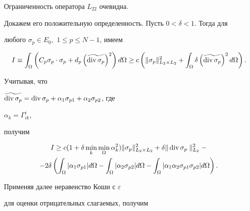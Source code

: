 \begin{pf} Ограниченность оператора $L_{22}$ очевидна.


Докажем его положительную определенность. Пусть $0<\delta <1$. Тогда для


любого $ \sigma_p \in E_0,$ $1 \le p \le N-1 $, имеем


$$


I \equiv


\int_ \Omega \left (


C_{p}\sigma _{p}\cdot \sigma _{p} + d_{p} \left ( \widetilde {\divv \sigma_p}


\right )^2 \right ) d \Omega \ge 


c \left ( \| \sigma_p \| ^2_{L_{2} \times L_{2}} 


+\int _{\Omega } 


\delta \left ( \widetilde {\divv \sigma_p } \right ) ^2 d\Omega \right ).


$$


Учитывая, что 


$


\widetilde {\divv \sigma_p} = \divv \sigma_p + \alpha _1 \sigma_{p1} +


\alpha _2 \sigma_{p2} $, где


$\alpha _k = \Gamma ^{i}_{ik} $, 


получим


\begin{gather*}


I \ge c 


(1+\delta \min_k \min_ \Omega


\alpha ^2_k ) \| \sigma_p \|^2_{L_2 \times L_2}+ 


\delta \| \divv \sigma_p \parallel ^2_{L_2} -\\


%


-2\delta\left(\int _{\Omega }| \alpha _1 \sigma_{p1}| d\Omega -


\int _{\Omega } |


\alpha _2 \sigma _{p2} | d\Omega 


- \int _{\Omega } | \alpha _1 \alpha _2


\sigma_{p1} \sigma _{p2}| d\Omega \right ).


\end{gather*}


Применяя далее неравенство Коши с $ \varepsilon $


для оценки отрицательных слагаемых, получим 


\begin{gather*}



\end{gather*}
\end{pf}
